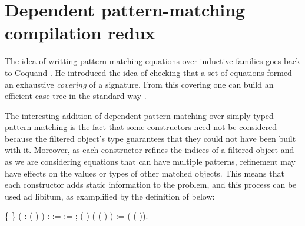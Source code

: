 \section{Dependent pattern-matching compilation redux}
\label{sec:sketch-patt-match}

The idea of writting pattern-matching equations over inductive families
goes back to Coquand \cite{coquand92baastad}. He introduced the idea of checking
that a set of equations formed an exhaustive \emph{covering} of a
signature. From this covering one can build an efficient case tree in
the standard way \cite{DBLP:conf/fpca/Augustsson85}.

The interesting addition of dependent pattern-matching over simply-typed
pattern-matching is the fact that some constructors need not be
considered because the filtered object's type guarantees that they
could not have been built with it. Moreover, as each constructor refines
the indices of a filtered object and as we are considering equations
that can have multiple patterns, refinement may have effects on the
values or types of other matched objects. This means that each
constructor adds static information to the problem, and this process 
can be used ad libitum, as examplified by the definition of
 below:

\begin{coqdoccode}
\coqdocemptyline
\coqdocnoindent
{}  \{ \} 
( :  (  ) ) :    :=\coqdoceol
\coqdocnoindent
{}    :=  ;\coqdoceol
\coqdocnoindent
{}  ( ) ( (   )  ) := \coqdoceol
\coqdocindent{1.00em}
  ( (  )).
\end{coqdoccode}

